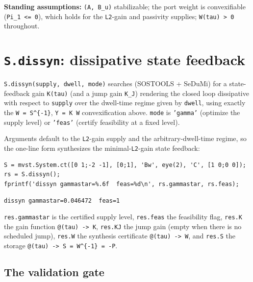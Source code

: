 \documentclass[11pt,oneside]{report}
\newcommand{\code}[1]{\texttt{#1}}
\begin{document}
\textbf{Standing assumptions:} \code{(A, B\_u)} stabilizable; the port weight is
convexifiable (\code{Pi\_1 \textless{}= 0}), which holds for the \code{L2}-gain and passivity
supplies; \code{W(tau) \textgreater{} 0} throughout.

\hypertarget{s.dissyn-dissipative-state-feedback}{%
\section{\texorpdfstring{\code{S.dissyn}: dissipative state feedback}{S.dissyn: dissipative state feedback}}\label{s.dissyn-dissipative-state-feedback}}

\code{S.dissyn(supply, dwell, mode)} searches (SOSTOOLS + SeDuMi) for a
state-feedback gain \code{K(tau)} (and a jump gain \code{K\_J}) rendering the closed loop
dissipative with respect to \code{supply} over the dwell-time regime given by \code{dwell}, using exactly
the \code{W = S\^{}\{-1\}}, \code{Y = K W} convexification above. \code{mode} is \code{'gamma'} (optimize
the supply level) or \code{'feas'} (certify feasibility at a fixed level).

Arguments default to the \code{L2}-gain supply and the arbitrary-dwell-time regime, so the
one-line form synthesizes the minimal-\code{L2}-gain state feedback:

\begin{lstlisting}[style=matlabstyle]
S = mvst.System.ct([0 1;-2 -1], [0;1], 'Bw', eye(2), 'C', [1 0;0 0]);
rs = S.dissyn();
fprintf('dissyn gammastar=%.6f  feas=%d\n', rs.gammastar, rs.feas);
\end{lstlisting}

\begin{lstlisting}[style=outputstyle]
dissyn gammastar=0.046472  feas=1
\end{lstlisting}

\code{res.gammastar} is the certified supply level, \code{res.feas} the feasibility flag,
\code{res.K} the gain function \code{@(tau) -\textgreater{} K}, \code{res.KJ} the jump gain (empty when
there is no scheduled jump), \code{res.W} the synthesis certificate \code{@(tau) -\textgreater{} W}, and
\code{res.S} the storage \code{@(tau) -\textgreater{} S = W\^{}\{-1\} = -P}.

\hypertarget{the-validation-gate}{%
\subsection{The validation gate}\label{the-validation-gate}}
\end{document}
